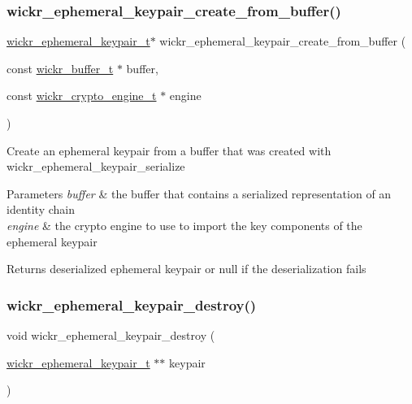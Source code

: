 \subsubsection{\texorpdfstring{wickr\+\_\+ephemeral\+\_\+keypair\+\_\+create\+\_\+from\+\_\+buffer()}{wickr\_ephemeral\_keypair\_create\_from\_buffer()}}
{\footnotesize\ttfamily \hyperlink{structwickr__ephemeral__keypair}{wickr\+\_\+ephemeral\+\_\+keypair\+\_\+t}$\ast$ wickr\+\_\+ephemeral\+\_\+keypair\+\_\+create\+\_\+from\+\_\+buffer (\begin{DoxyParamCaption}\item[{const \hyperlink{structwickr__buffer}{wickr\+\_\+buffer\+\_\+t} $\ast$}]{buffer,  }\item[{const \hyperlink{structwickr__crypto__engine}{wickr\+\_\+crypto\+\_\+engine\+\_\+t} $\ast$}]{engine }\end{DoxyParamCaption})}

Create an ephemeral keypair from a buffer that was created with \textquotesingle{}wickr\+\_\+ephemeral\+\_\+keypair\+\_\+serialize\textquotesingle{}


\begin{DoxyParams}{Parameters}
{\em buffer} & the buffer that contains a serialized representation of an identity chain \\
\hline
{\em engine} & the crypto engine to use to import the key components of the ephemeral keypair \\
\hline
\end{DoxyParams}
\begin{DoxyReturn}{Returns}
deserialized ephemeral keypair or null if the deserialization fails 
\end{DoxyReturn}
\mbox{\label{group__wickr__ephemeral__keypair_gab77107c0b1a0d145c606817eeecec63d}} 
\subsubsection{\texorpdfstring{wickr\+\_\+ephemeral\+\_\+keypair\+\_\+destroy()}{wickr\_ephemeral\_keypair\_destroy()}}
{\footnotesize\ttfamily void wickr\+\_\+ephemeral\+\_\+keypair\+\_\+destroy (\begin{DoxyParamCaption}\item[{\hyperlink{structwickr__ephemeral__keypair}{wickr\+\_\+ephemeral\+\_\+keypair\+\_\+t} $\ast$$\ast$}]{keypair }\end{DoxyParamCaption})}

